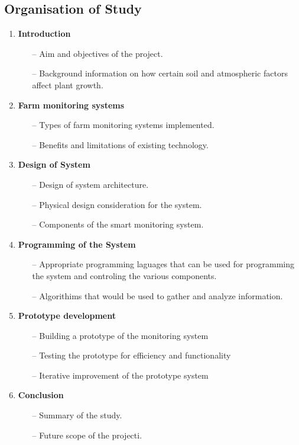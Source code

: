 \documentclass[12pt, a4paper]{article}
\begin{document}
\subsection{Organisation of Study}
\begin{enumerate}
\item \textbf{Introduction}
	\begin{itemize}
	\item[--] Aim and objectives of the project.
	\item[--] Background information on how certain soil and atmospheric factors affect plant    growth.
	\end{itemize}
\item \textbf{Farm monitoring systems}
\begin{itemize}
    \item[--] Types of farm monitoring systems implemented.
	\item[--] Benefits and limitations of existing technology.
\end{itemize}
\item \textbf{Design of System}
\begin{itemize}
	\item[--] Design of system architecture.
    \item[--] Physical design consideration for the system.
    \item[--] Components of the smart monitoring system.
\end{itemize}
\item \textbf{Programming of the System}
\begin{itemize}
	\item[--] Appropriate programming laguages that can be used for programming the system and controling the various components.
	\item[--] Algorithims that would be used to gather and analyze information.
\end{itemize}
\item \textbf{Prototype development}
\begin{itemize}
\item[--] Building a prototype of the monitoring system
\item[--] Testing the prototype for efficiency and functionality
\item[--] Iterative improvement of the prototype system
\end{itemize}
\item \textbf{Conclusion}
\begin{itemize}
\item[--] Summary of the study.
\item[--] Future scope of the projecti.
\end{itemize}
\end{enumerate}
\newpage
\end{document}
